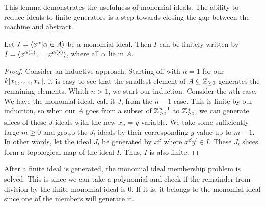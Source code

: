 This lemma demonstrates the usefulness of monomial ideals. The ability to reduce ideals to finite generators is a step towards closing the gap between the machine and abstract. 

\begin{theorem}
Let $I = \langle x^\alpha | \alpha \in A \rangle$ be a monomial ideal. Then $I$ can be finitely written by $I = \langle x^{\alpha(1)}, ... , x^{\alpha(s)} \rangle$, where all $\alpha$ lie in $A$.  
\end{theorem}

\begin{proof}
   Consider an inductive approach. Starting off with $n=1$ for our $k[x_1, \dots, x_n]$, it is easy to see that the smallest element of $A \subseteq \mathbb{Z}_{\ge 0}$ generates the remaining elements. Whith $n > 1$, we start our induction. Consider the $n$th case. We have the monomial ideal, call it $J$, from the $n-1$ case. This is finite by our induction, so when our $A$ goes from a subset of $\mathbb{Z}_{\ge 0}^{n-1}$ to $\mathbb{Z}_{\ge 0}^{n}$, we can generate slices of these $J$ ideals with the new $x_n = y$ variable. We take some sufficiently large $m \ge 0$ and group the $J_l$ ideals by their corresponding $y$ value up to $m-1$. In other words, let the ideal $J_l$ be generated by $x^\beta$ where $x^\beta y^l \in I$. These $J_l$ slices form a topological map of the ideal $I$. Thus, $I$ is also finite.    
\end{proof}

After a finite ideal is generated, the monomial ideal membership problem is solved. This is since we can take a polynomial and check if the remainder from division by the finite monomial ideal is $0$. If it is, it belongs to the monomial ideal since one of the members will generate it. 